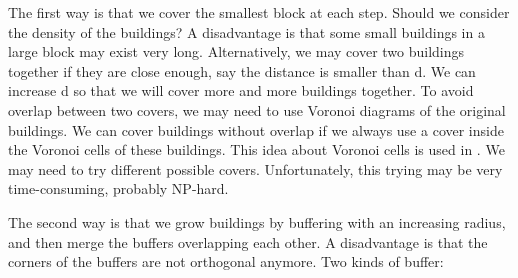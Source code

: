 \documentclass[graybox]{svmult}
\begin{document}
The first way is that we cover the smallest block at each step. 
Should we consider the density of the buildings? 
A disadvantage 
is that some small buildings in a large block may exist very 
long.
Alternatively, we may cover two buildings together if they are 
close enough, say the distance is smaller than d. We can 
increase d so that we will cover more and more buildings 
together. To avoid overlap between two covers, we may need to 
use Voronoi diagrams of the original buildings. We can cover 
buildings without overlap if we always use a cover inside the 
Voronoi cells of these buildings. This idea about Voronoi cells 
is used in \textcite{vanGoethem2013}. We may need to try 
different 
possible covers. 
Unfortunately, this trying may be very time-consuming, probably 
NP-hard.

The second way is that we grow buildings by buffering with an 
increasing radius, and then merge the buffers overlapping each 
other. A disadvantage is that the corners of the buffers 
are not 
orthogonal anymore. Two kinds of buffer:
\end{document}
